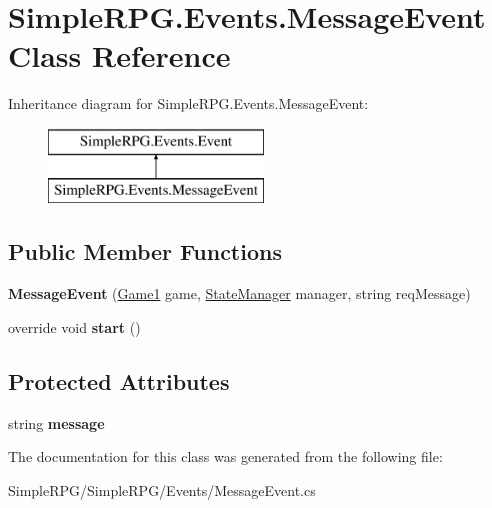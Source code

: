 \hypertarget{class_simple_r_p_g_1_1_events_1_1_message_event}{\section{Simple\-R\-P\-G.\-Events.\-Message\-Event Class Reference}
\label{class_simple_r_p_g_1_1_events_1_1_message_event}
}
Inheritance diagram for Simple\-R\-P\-G.\-Events.\-Message\-Event\-:\begin{figure}[H]
\begin{center}
\leavevmode
\includegraphics[height=2.000000cm]{class_simple_r_p_g_1_1_events_1_1_message_event}
\end{center}
\end{figure}
\subsection*{Public Member Functions}
\begin{DoxyCompactItemize}
\item 
\hypertarget{class_simple_r_p_g_1_1_events_1_1_message_event_ac726b325c3a3524d04eb0ec26613fe0f}{{\bfseries Message\-Event} (\hyperlink{class_simple_r_p_g_1_1_game1}{Game1} game, \hyperlink{class_simple_r_p_g_1_1_states_1_1_state_manager}{State\-Manager} manager, string req\-Message)}\label{class_simple_r_p_g_1_1_events_1_1_message_event_ac726b325c3a3524d04eb0ec26613fe0f}

\item 
\hypertarget{class_simple_r_p_g_1_1_events_1_1_message_event_ab615ebfc5d3227ecf36ca235e532a498}{override void {\bfseries start} ()}\label{class_simple_r_p_g_1_1_events_1_1_message_event_ab615ebfc5d3227ecf36ca235e532a498}

\end{DoxyCompactItemize}
\subsection*{Protected Attributes}
\begin{DoxyCompactItemize}
\item 
\hypertarget{class_simple_r_p_g_1_1_events_1_1_message_event_a0f7824800c128e02c3b41c641adc5d59}{string {\bfseries message}}\label{class_simple_r_p_g_1_1_events_1_1_message_event_a0f7824800c128e02c3b41c641adc5d59}

\end{DoxyCompactItemize}


The documentation for this class was generated from the following file\-:\begin{DoxyCompactItemize}
\item 
Simple\-R\-P\-G/\-Simple\-R\-P\-G/\-Events/Message\-Event.\-cs\end{DoxyCompactItemize}
